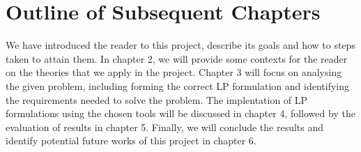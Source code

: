 \section{Outline of Subsequent Chapters}
We have introduced the reader to this project, describe its goals and how to steps taken to attain them. In chapter 2,
we will provide some contexts for the reader on the theories that we apply in the project. Chapter 3 will focus on
analysing the given problem, including forming the correct LP formulation and identifying the requirements needed to solve the problem.
The implentation of LP formulations using the chosen tools will be discussed in chapter 4, followed by the evaluation of results
in chapter 5. Finally, we will conclude the results and identify potential future works
of this project in chapter 6.